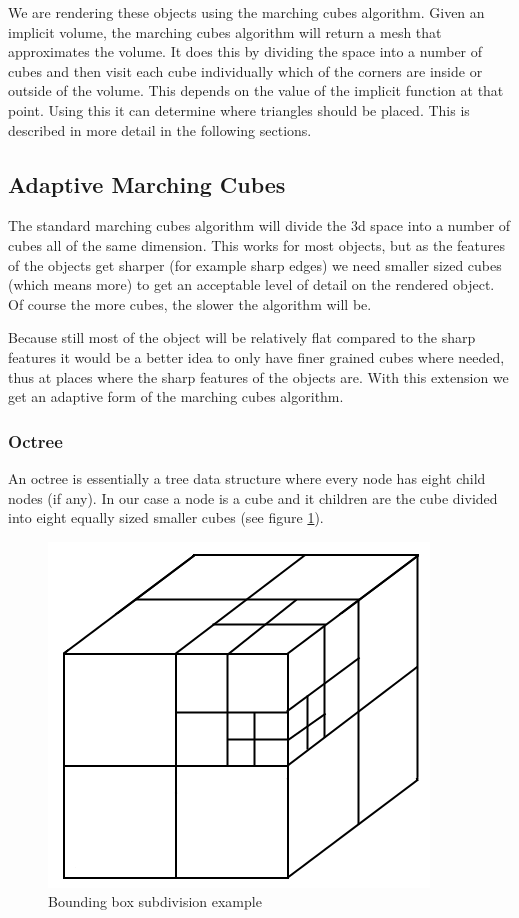 \documentclass[a4paper,10pt,twocolumn]{article}
\begin{document}
We are rendering these objects using the marching cubes algorithm. Given an implicit volume, the marching cubes algorithm will return a mesh that approximates the volume. It does this by dividing the space into a number of cubes and then visit each cube individually which of the corners are inside or outside of the volume. This depends on the value of the implicit function at that point. Using this it can determine where triangles should be placed. This is described in more detail in the following sections.

\subsection{Adaptive Marching Cubes}

The standard marching cubes algorithm will divide the 3d space into a number of cubes all of the same dimension. This works for most objects, but as the features of the objects get sharper (for example sharp edges) we need smaller sized cubes (which means more) to get an acceptable level of detail on the rendered object. Of course the more cubes, the slower the algorithm will be.

Because still most of the object will be relatively flat compared to the sharp features it would be a better idea to only have finer grained cubes where needed, thus at places where the sharp features of the objects are. With this extension we get an adaptive form of the marching cubes algorithm.

\subsubsection{Octree}

An octree is essentially a tree data structure where every node has eight child nodes (if any). In our case a node is a cube and it children are the cube divided into eight equally sized smaller cubes (see figure \ref{figure:octree}).

    \begin{figure}[h]
        \begin{center}
            \includegraphics[scale=0.4]{./images/octree_block}
        \end{center}
        \caption{Bounding box subdivision example}
        \label{figure:octree}
    \end{figure}
\end{document}
